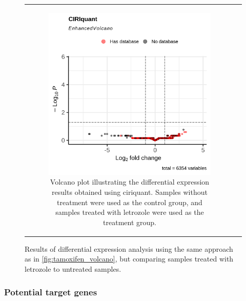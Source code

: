 \begin{figure}[H]
\begin{tabular}{cc}
\begin{subfigure}{0.5\textwidth}
            \includegraphics[width=\linewidth]{chapters/4_results_and_discussion/figures/dea/ciriquant/letrozole/volcano.png}
            \caption{Volcano plot illustrating the differential expression
                results obtained using \gls{ciriquant}.
                Samples without treatment were used as the control group, and samples treated
                with letrozole were used as the treatment group.
            }
            \label{fig:letrozole_volcano_ciriquant}
        \end{subfigure} &

    \end{tabular}
    \caption{Results of differential expression analysis using the same
        approach as in
        \cref{fig:tamoxifen_volcano}, but comparing samples treated with
        letrozole
        to untreated samples.
    }
    \label{fig:letrozole_volcano}
\end{figure}

\subsubsection{Potential target genes}
